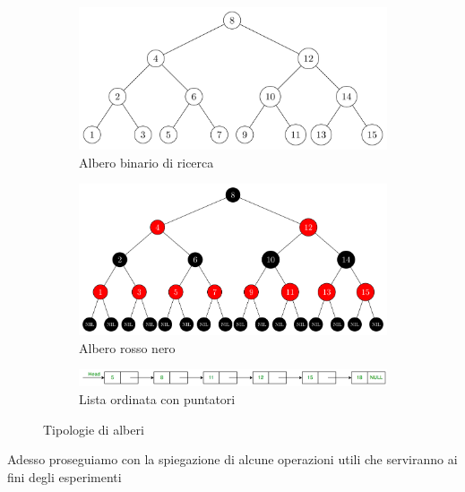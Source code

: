 \begin{figure}[h]
    \centering
    \begin{subfigure}[H]{0.4\textwidth}
        \centering
        \includegraphics[width=1\textwidth]{Images/ABR.png}
        \caption{Albero binario di ricerca}
    \end{subfigure}
    \hfill
    \begin{subfigure}[H]{0.4\textwidth}
        \centering
        \includegraphics[width=1\textwidth]{Images/RB.png}
        \caption{Albero rosso nero}
    \end{subfigure}
    \hfill
    \begin{subfigure}[H]{0.6\textwidth}
        \centering
        \includegraphics[width=1\textwidth]{Images/SL.png}
        \caption{Lista ordinata con puntatori}
    \end{subfigure}
    \caption{Tipologie di alberi}
\end{figure}

Adesso proseguiamo con la spiegazione di alcune operazioni utili che serviranno ai fini degli esperimenti

